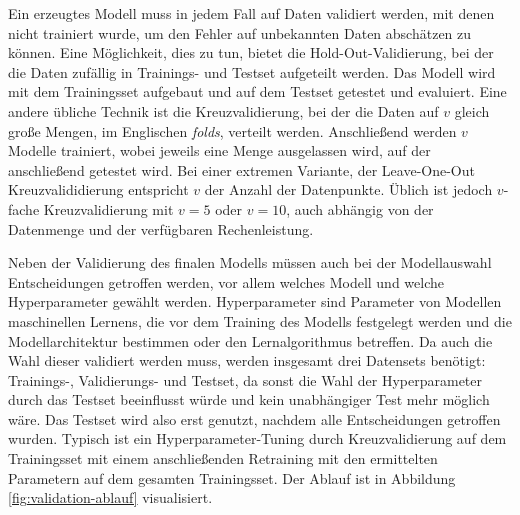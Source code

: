 	Ein erzeugtes Modell muss in jedem Fall auf Daten validiert werden, mit denen nicht trainiert wurde, um den Fehler auf unbekannten Daten abschätzen zu können. Eine Möglichkeit, dies zu tun, bietet die Hold-Out-Validierung, bei der die Daten zufällig in Trainings- und Testset aufgeteilt werden. Das Modell wird mit dem Trainingsset aufgebaut und auf dem Testset getestet und evaluiert. Eine andere übliche Technik ist die Kreuzvalidierung, bei der die Daten auf $v $ gleich große Mengen, im Englischen \textit{folds}, verteilt werden. Anschließend werden $v$ Modelle trainiert, wobei jeweils eine Menge ausgelassen wird, auf der anschließend getestet wird. Bei einer extremen Variante, der Leave-One-Out Kreuzvalididierung entspricht $v$ der Anzahl der Datenpunkte. Üblich ist jedoch $v$-fache Kreuzvalidierung mit $v=5$ oder $v=10$, auch abhängig von der Datenmenge und der verfügbaren Rechenleistung.
	
	Neben der Validierung des finalen Modells müssen auch bei der Modellauswahl Entscheidungen getroffen werden, vor allem welches Modell und welche Hyperparameter gewählt werden. Hyperparameter sind Parameter von Modellen maschinellen Lernens, die vor dem Training des Modells festgelegt werden und die Modellarchitektur bestimmen oder den Lernalgorithmus betreffen. Da auch die Wahl dieser validiert werden muss, werden insgesamt drei Datensets benötigt: Trainings-, Validierungs- und Testset, da sonst die Wahl der Hyperparameter durch das Testset beeinflusst würde und kein unabhängiger Test mehr möglich wäre. Das Testset wird also erst genutzt, nachdem alle Entscheidungen getroffen wurden. Typisch ist ein Hyperparameter-Tuning durch Kreuzvalidierung auf dem Trainingsset mit einem anschließenden Retraining mit den ermittelten Parametern auf dem gesamten Trainingsset. Der Ablauf ist in Abbildung \ref{fig:validation-ablauf} visualisiert.
	
